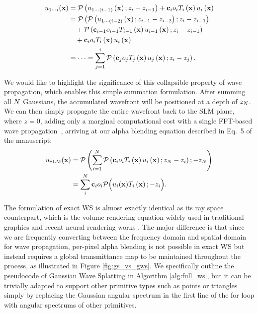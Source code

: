 \begin{align}
u_{1 \cdots i} (\mathbf{x}) &= \mathcal{P}\left(u_{1 \cdots (i-1)}\left(\mathbf{x}\right) ; z_{i} - z_{i-1}\right) + \mathbf{c}_i o_i T_i\left(\mathbf{x}\right)  u_i\left(\mathbf{x}\right) \nonumber \\
&= \mathcal{P}\left( \mathcal{P}\left(u_{1 \cdots (i-2)}\left(\mathbf{x}\right); z_{i-1} - z_{i-2} \right)  ; z_{i} - z_{i-1}\right) \nonumber \\
&\quad + \mathcal{P} \left( \mathbf{c}_{i-1} o_{i-1} T_{i-1} \left( \mathbf{x}\right)  u_{i-1} \left( \mathbf{x} \right); z_{i} - z_{i-1} \right) \nonumber \\ 
&\quad + \mathbf{c}_i o_i T_i\left(\mathbf{x}\right)  u_i\left(\mathbf{x}\right) \nonumber \\
&= \cdots = \sum_{j=1}^{i} \mathcal{P} \left( \mathbf{c}_j o_j T_j \left(\mathbf{x}\right)  u_j \left(\mathbf{x}\right); z_i - z_j\right) .\label{eq:awb_up_to_idx}
\end{align}

We would like to highlight the significance of this collapsible property of wave propagation, which enables this simple summation formulation. After summing all $N$ Gaussians, the accumulated wavefront will be positioned at a depth of $z_N$. We can then simply propagate the entire wavefront back to the SLM plane, where $z=0$, adding only a marginal computational cost with a single FFT-based wave propagation~\cite{shimobaba2009simple}, arriving at our alpha blending equation described in Eq.~5 of the manuscript:
\begin{align}    
    u_{\textrm{SLM}} (\mathbf{x}) &= \mathcal{P} \left(\sum_{i=1}^{N} \mathcal{P} \left( \mathbf{c}_i o_i T_i \left(\mathbf{x}\right)  u_i \left(\mathbf{x}\right); z_N - z_i\right); -z_N \right) \\
    &=\sum_{i}^N \mathbf{c}_i o_i\mathcal{P}\Big(  u_i(\mathbf{x})T_i\left(\mathbf{x}\right) ; -z_i\Big). \label{eq:gwsplat_supp}
\end{align}


The formulation of exact WS is almost exactly identical as its ray space counterpart, which is the volume rendering equation widely used in traditional graphics and recent neural rendering works \cite{mildenhall2020nerf, kerbl3Dgaussians}. The major difference is that since we are frequently converting between the frequency domain and spatial domain for wave propagation, per-pixel alpha blending is not possible in exact WS but instead requires a global transmittance map to be maintained throughout the process, as illustrated in Figure \ref{fig:gs_vs_gws}. We specifically outline the pseudocode of Gaussian Wave Splatting in Algorithm \ref{alg:full_ws}, but it can be trivially adapted to support other primitive types such as points or triangles simply by replacing the Gaussian angular spectrum in the first line of the for loop with angular spectrums of other primitives. 

